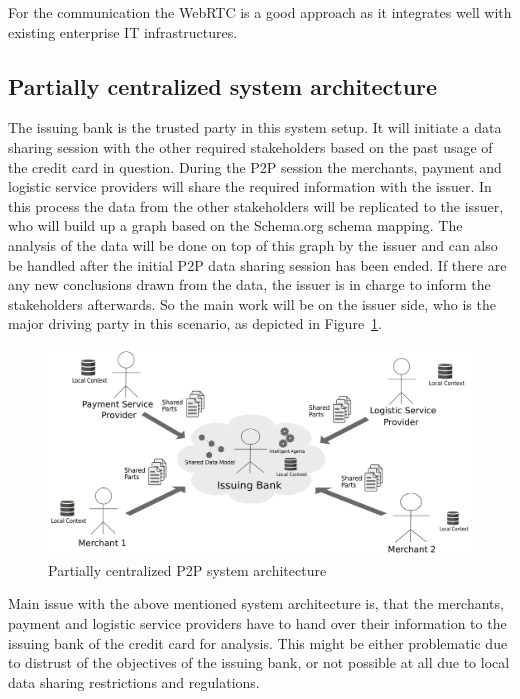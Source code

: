 For the communication the \gls{WebRTC} is a good approach as it integrates well with existing enterprise IT infrastructures.


\subsection{Partially centralized system architecture}
\label{subsec:p2p_partially_centralized_system}

The issuing bank is the trusted party in this system setup. It will initiate a data sharing session with the other required stakeholders based on the past usage of the credit card in question. During the P2P session the merchants, payment and logistic service providers will share the required information with the issuer. In this process the data from the other stakeholders will be replicated to the issuer, who will build up a graph based on the Schema.org schema mapping. The analysis of the data will be done on top of this graph by the issuer and can also be handled after the initial P2P data sharing session has been ended. If there are any new conclusions drawn from the data, the issuer is in charge to inform the stakeholders afterwards. So the main work will be on the issuer side, who is the major driving party in this scenario, as depicted in Figure~\ref{fig:images_p2p_centralized}.\@

\begin{figure}[H]
	\centering
		\includegraphics[width=0.8\columnwidth]{images/system_P2P_centralized.pdf}
	\caption{Partially centralized P2P system architecture}
\label{fig:images_p2p_centralized}
\end{figure}

Main issue with the above mentioned system architecture is, that the merchants, payment and logistic service providers have to hand over their information to the issuing bank of the credit card for analysis. This might be either problematic due to distrust of the objectives of the issuing bank, or not possible at all due to local data sharing restrictions and regulations.


